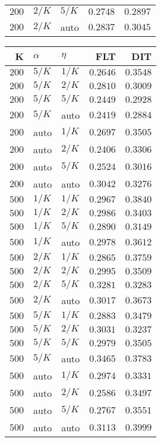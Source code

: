 \begin{table}
\begin{spacing}{1.2}
{\begin{tabular}{rll|rr}
$200$ &  $2/K$ &  $5/K$ &         $0.2748$ & $0.2897$ \\
$200$ &  $2/K$ &   auto &         $0.2837$ & $0.3045$ \\
\bottomrule
\end{tabular}
} \hfill \parbox{.45\linewidth}{\centering \begin{tabular}{rll|rr}
\toprule
    K &  $\alpha$ &    $\eta$ & FLT &        DIT \\
\midrule
$200$ &  $5/K$ &  $1/K$ &         $0.2646$ &      $0.3548$ \\
$200$ &  $5/K$ &  $2/K$ &         $0.2810$ &      $0.3009$ \\
$200$ &  $5/K$ &  $5/K$ &         $0.2449$ &      $0.2928$ \\
$200$ &  $5/K$ &   auto &         $0.2419$ &      $0.2884$ \\
$200$ &   auto &  $1/K$ &         $0.2697$ &      $0.3505$ \\
$200$ &   auto &  $2/K$ &         $0.2406$ &      $0.3306$ \\
$200$ &   auto &  $5/K$ &         $0.2524$ &      $0.3016$ \\
$200$ &   auto &   auto &         $0.3042$ &      $0.3276$ \\
$500$ &  $1/K$ &  $1/K$ &         $0.2967$ &      $0.3840$ \\
$500$ &  $1/K$ &  $2/K$ &         $0.2986$ &      $0.3403$ \\
$500$ &  $1/K$ &  $5/K$ &         $0.2890$ &      $0.3149$ \\
$500$ &  $1/K$ &   auto &         $0.2978$ &      $0.3612$ \\
$500$ &  $2/K$ &  $1/K$ &         $0.2865$ &      $0.3759$ \\
$500$ &  $2/K$ &  $2/K$ &         $0.2995$ &      $0.3509$ \\
$500$ &  $2/K$ &  $5/K$ &         $0.3281$ &      $0.3283$ \\
$500$ &  $2/K$ &   auto &         $0.3017$ &      $0.3673$ \\
$500$ &  $5/K$ &  $1/K$ &         $0.2883$ &      $0.3479$ \\
$500$ &  $5/K$ &  $2/K$ &         $0.3031$ &      $0.3237$ \\
$500$ &  $5/K$ &  $5/K$ &         $0.2979$ &      $0.3505$ \\
$500$ &  $5/K$ &   auto &    $\bm{0.3465}$ &      $0.3783$ \\
$500$ &   auto &  $1/K$ &         $0.2974$ &      $0.3331$ \\
$500$ &   auto &  $2/K$ &         $0.2586$ &      $0.3497$ \\
$500$ &   auto &  $5/K$ &         $0.2767$ &      $0.3551$ \\
$500$ &   auto &   auto &         $0.3113$ & $\bm{0.3999}$ \\
\bottomrule
\end{tabular}
}
\end{spacing}
\end{table}
